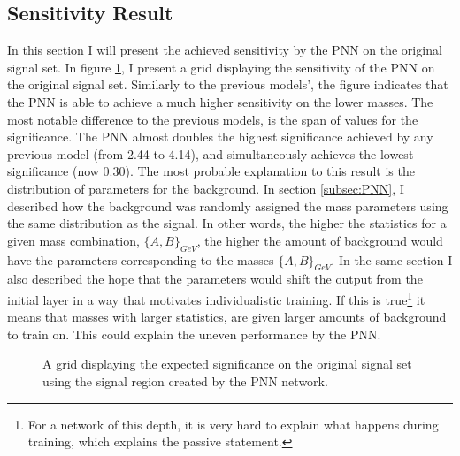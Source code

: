 \subsection{Sensitivity Result}
In this section I will present the achieved sensitivity by the \ac{PNN} on the original signal set. In figure \ref{fig:PNNGridSig}, I present a grid displaying the sensitivity 
of the \ac{PNN} on the original signal set. Similarly to the previous models', the figure indicates that the \ac{PNN} is able to achieve a much higher sensitivity on the lower
masses. The most notable difference to the previous models, is the span of values for the significance. The \ac{PNN} almost doubles the highest significance achieved by any previous model
(from 2.44 to 4.14), and simultaneously achieves the lowest significance (now 0.30). The most probable explanation to this result is the distribution of parameters for the background. 
In section \ref{subsec:PNN}, I described how the background was randomly assigned the mass parameters using the same distribution as the signal. In other words, the higher the statistics 
for a given mass combination, $\{A,B\}_{GeV}$, the higher the amount of background would have the parameters corresponding to the masses $\{A,B\}_{GeV}$. In the 
same section I also described the hope that the parameters would shift the output from the initial layer in a way that motivates individualistic training. If this is 
true\footnote{For a network of this depth, it is very hard to explain what happens during training, which explains the passive statement.} it means that masses with larger statistics, 
are given larger amounts of background to train on. This could explain the uneven performance by the \ac{PNN}. \\
\begin{figure}[H]
    \caption{A grid displaying the expected significance on the original signal set using the signal region 
    created by the \acs{PNN} network.}
    \label{fig:PNNGridSig}
\end{figure}
